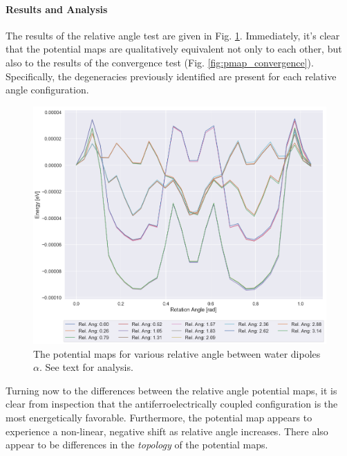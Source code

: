         \paragraph{Results and Analysis}
        
        The results of the relative angle test are given in Fig. \ref{fig:pmap_rel_angle}. Immediately, it's clear that the potential maps are qualitatively equivalent not only to each other, but also to the results of the convergence test (Fig. \ref{fig:pmap_convergence}). Specifically, the degeneracies previously identified are present for each relative angle configuration. 
        
        \begin{figure}
            \centering
            \includegraphics[width=0.9\linewidth]{Figures/System/pmap_rel_angle.png}
            \caption{The potential maps for various relative angle between water dipoles $\alpha$. See text for analysis.}
            \label{fig:pmap_rel_angle}
        \end{figure}
        
        Turning now to the differences between the relative angle potential maps, it is clear from inspection that the antiferroelectrically coupled configuration is the most energetically favorable. Furthermore, the potential map appears to experience a non-linear, negative shift as relative angle increases. There also appear to be differences in the \textit{topology} of the potential maps. 
        
